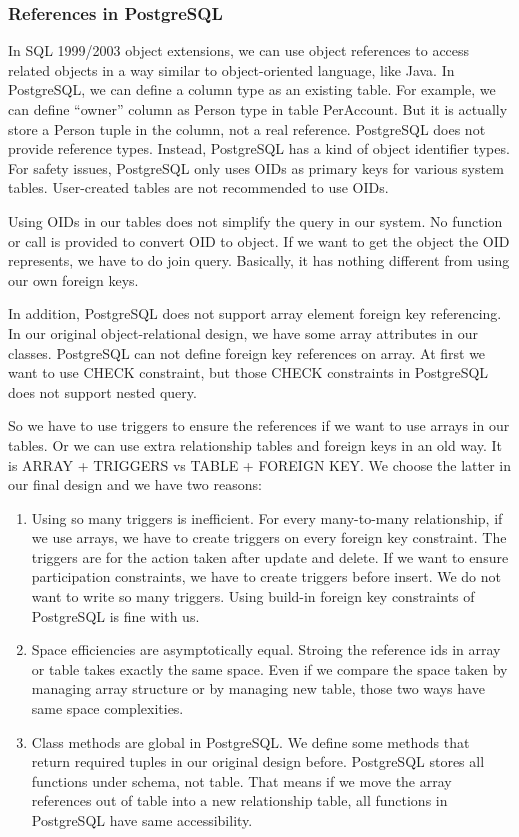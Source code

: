 \documentclass[11pt]{article}
\begin{document}
\subsubsection{References in PostgreSQL}
\label{sec:refinpgsql}
\par
In SQL 1999/2003 object extensions, we can use object references to access related objects in a way similar to object-oriented language, like Java. In PostgreSQL, we can define a column type as an existing table. For example, we can define ``owner'' column as Person type in table PerAccount. But it is actually store a Person tuple in the column, not a real reference. PostgreSQL does not provide reference types. Instead, PostgreSQL has a kind of object identifier types. For safety issues, PostgreSQL only uses OIDs as primary keys for various system tables. User-created tables are not recommended to use OIDs.
\par
Using OIDs in our tables does not simplify the query in our system. No function or call is provided to convert OID to object. If we want to get the object the OID represents, we have to do join query. Basically, it has nothing different from using our own foreign keys.
\par
In addition, PostgreSQL does not support array element foreign key referencing. In our original object-relational design, we have some array attributes in our classes. PostgreSQL can not define foreign key references on array. At first we want to use CHECK constraint, but those CHECK constraints in PostgreSQL does not support nested query.
\par
So we have to use triggers to ensure the references if we want to use arrays in our tables. Or we can use extra relationship tables and foreign keys in an old way. It is ARRAY + TRIGGERS vs TABLE + FOREIGN KEY. We choose the latter in our final design and we have two reasons:
\par
\begin{enumerate}
\item Using so many triggers is inefficient. For every many-to-many relationship, if we use arrays, we have to create triggers on every foreign key constraint. The triggers are for the action taken after update and delete. If we want to ensure participation constraints, we have to create triggers before insert. We do not want to write so many triggers. Using build-in foreign key constraints of PostgreSQL is fine with us.
\item Space efficiencies are asymptotically equal. Stroing the reference ids in array or table takes exactly the same space. Even if we compare the space taken by managing array structure or by managing new table, those two ways have same space complexities.
\item Class methods are global in PostgreSQL. We define some methods that return required tuples in our original design before. PostgreSQL stores all functions under schema, not table. That means if we move the array references out of table into a new relationship table, all functions in PostgreSQL have same accessibility.
\end{enumerate}
\end{document}
